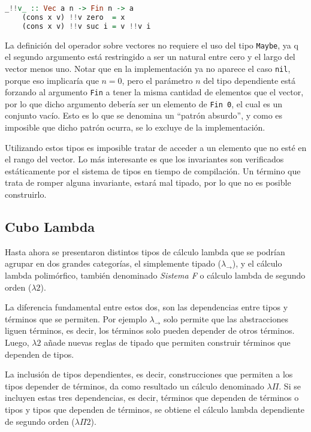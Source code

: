\begin{lstlisting}[mathescape, language=Haskell, deletekeywords={zero}]
	_!!v_ :: Vec a n -> Fin n -> a
	(cons x v) !!v zero  = x
	(cons x v) !!v suc i = v !!v i
\end{lstlisting}

La definición del operador sobre vectores no requiere el uso del tipo \verb|Maybe|, ya q el segundo argumento está restringido a ser un natural entre cero y el largo del vector menos uno.
Notar que en la implementación ya no aparece el caso \verb|nil|, porque eso implicaría que $n = 0$, pero el parámetro $n$ del tipo dependiente está forzando al argumento \verb|Fin| a tener la misma cantidad de elementos que el vector, por lo que dicho argumento debería ser un elemento de \verb|Fin 0|, el cual es un conjunto vacío.
Esto es lo que se denomina un ``patrón absurdo'', y como es imposible que dicho patrón ocurra, se lo excluye de la implementación.

Utilizando estos tipos es imposible tratar de acceder a un elemento que no esté en el rango del vector.
Lo más interesante es que los invariantes son verificados estáticamente por el sistema de tipos en tiempo de compilación.
Un término que trata de romper alguna invariante, estará mal tipado, por lo que no es posible construirlo.


\subsection{Cubo Lambda}
Hasta ahora se presentaron distintos tipos de cálculo lambda que se podrían agrupar en dos grandes categorías, el simplemente tipado ($\lambda_{\to}$), y el cálculo lambda polimórfico, también denominado \textit{Sistema F} o cálculo lambda de segundo orden ($\lambda 2$).

La diferencia fundamental entre estos dos, son las dependencias entre tipos y términos que se permiten.
Por ejemplo $\lambda_{\to}$ solo permite que las abstracciones liguen términos, es decir, los términos solo pueden depender de otros términos.
Luego, $\lambda 2$ añade nuevas reglas de tipado que permiten construir términos que dependen de tipos.

La inclusión de tipos dependientes, es decir, construcciones que permiten a los tipos depender de términos, da como resultado un cálculo denominado $\lambda\Pi$.
Si se incluyen estas tres dependencias, es decir, términos que dependen de términos o tipos y tipos que dependen de términos, se obtiene el cálculo lambda dependiente de segundo orden ($\lambda\Pi 2$).

